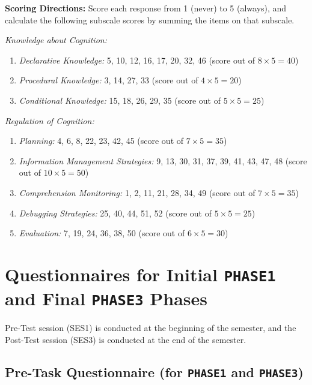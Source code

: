 \documentclass[letterpaper, nobind]{templates/ociamthesis}
\providecommand{\tightlist}{%
  \setlength{\itemsep}{0pt}\setlength{\parskip}{0pt}}
\begin{document}
\textbf{Scoring Directions:} Score each response from 1 (never) to 5
(always), and calculate the following subscale scores by summing the
items on that subscale.

\emph{Knowledge about Cognition:}

\begin{enumerate}
\def\labelenumi{\arabic{enumi}.}
\tightlist
\item
  \emph{Declarative Knowledge:} 5, 10, 12, 16, 17, 20, 32, 46 (score out of \(8\times5 = 40\))
\item
  \emph{Procedural Knowledge:} 3, 14, 27, 33 (score out of \(4\times5 = 20\))
\item
  \emph{Conditional Knowledge:} 15, 18, 26, 29, 35 (score out of \(5\times5 = 25\))
\end{enumerate}

\emph{Regulation of Cognition:}

\begin{enumerate}
\def\labelenumi{\arabic{enumi}.}
\tightlist
\item
  \emph{Planning:} 4, 6, 8, 22, 23, 42, 45 (score out of \(7\times5 = 35\))
\item
  \emph{Information Management Strategies:} 9, 13, 30, 31, 37, 39, 41, 43, 47, 48 (score out of \(10\times5 = 50\))
\item
  \emph{Comprehension Monitoring:} 1, 2, 11, 21, 28, 34, 49 (score out of \(7\times5 = 35\))
\item
  \emph{Debugging Strategies:} 25, 40, 44, 51, 52 (score out of \(5\times5 = 25\))
\item
  \emph{Evaluation:} 7, 19, 24, 36, 38, 50 (score out of \(6\times5 = 30\))
\end{enumerate}

\hypertarget{app-phase13}{%
\chapter{\texorpdfstring{Questionnaires for Initial \texttt{PHASE1} and Final \texttt{PHASE3} Phases}{Questionnaires for Initial PHASE1 and Final PHASE3 Phases}}\label{app-phase13}}

Pre-Test session (SES1) is conducted at the beginning of the semester,
and the Post-Test session (SES3) is conducted at the end of the
semester.

\hypertarget{app-phase13-pretask}{%
\section{\texorpdfstring{Pre-Task Questionnaire (for \texttt{PHASE1} and \texttt{PHASE3})}{Pre-Task Questionnaire (for PHASE1 and PHASE3)}}\label{app-phase13-pretask}}
\end{document}

